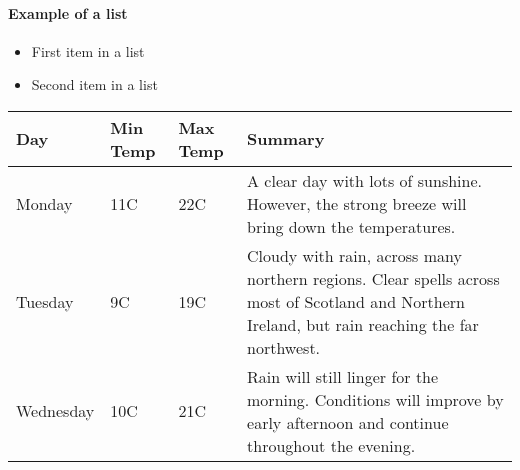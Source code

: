 \paragraph{Example of a list}
  \begin{itemize}
    \item First item in a list
    \item Second item in a list
  \end{itemize}

\begin{tabular}{ | l | l | l | p{5cm} |}
  \hline
  Day & Min Temp & Max Temp & Summary \\ \hline
  Monday & 11C & 22C & A clear day with lots of sunshine.
  However, the strong breeze will bring down the temperatures. \\ \hline
  Tuesday & 9C & 19C & Cloudy with rain, across many northern regions. Clear spells
  across most of Scotland and Northern Ireland,
  but rain reaching the far northwest. \\ \hline
  Wednesday & 10C & 21C & Rain will still linger for the morning.
  Conditions will improve by early afternoon and continue
  throughout the evening. \\
  \hline
\end{tabular}




\finishDocument


